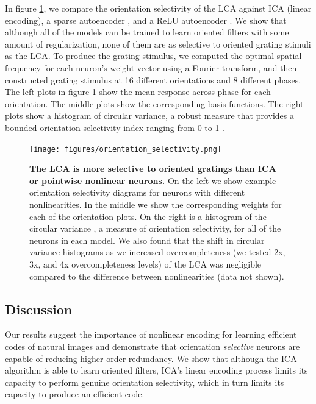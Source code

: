 In figure \ref{fig:ch4_orientation_selectivity}, we compare the orientation selectivity of the LCA against ICA (linear encoding), a sparse autoencoder \parencite{ng2011sparse}, and a ReLU autoencoder \cite{nair2010rectified}. We show that although all of the models can be trained to learn oriented filters with some amount of regularization, none of them are as selective to oriented grating stimuli as the LCA. To produce the grating stimulus, we computed the optimal spatial frequency for each neuron's weight vector using a Fourier transform, and then constructed grating stimulus at 16 different orientations and 8 different phases. The left plots in figure \ref{fig:ch4_orientation_selectivity} show the mean response across phase for each orientation. The middle plots show the corresponding basis functions. The right plots show a histogram of circular variance, a robust measure that provides a bounded orientation selectivity index ranging from 0 to 1 \parencite{ringach2002orientation}.

\begin{figure}[h]
    \centering
    \texttt{[image: figures/orientation\_selectivity.png]}
    \caption{\textbf{The LCA is more selective to oriented gratings than ICA or pointwise nonlinear neurons.} On the left we show example orientation selectivity diagrams for neurons with different nonlinearities. In the middle we show the corresponding weights for each of the orientation plots. On the right is a histogram of the circular variance \cite{ringach2002orientation}, a measure of orientation selectivity, for all of the neurons in each model. We also found that the shift in circular variance histograms as we increased overcompleteness (we tested 2x, 3x, and 4x overcompleteness levels) of the LCA was negligible compared to the difference between nonlinearities (data not shown).}
    \label{fig:ch4_orientation_selectivity}
\end{figure}


\subsection{Discussion}
Our results suggest the importance of nonlinear encoding for learning efficient codes of natural images and demonstrate that orientation \textit{selective} neurons are capable of reducing higher-order redundancy. We show that although the ICA algorithm is able to learn oriented filters, ICA's linear encoding process limits its capacity to perform genuine orientation selectivity, which in turn limits its capacity to produce an efficient code. 

